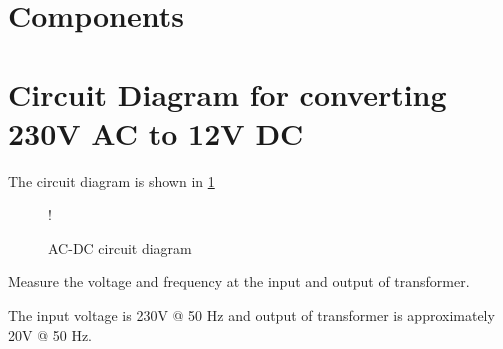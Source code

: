 \documentclass[journal,12pt,twocolumn]{IEEEtran}
\begin{document}
\section{Components}
\begin{table}[!h]
\centering

\caption{}
\label{table:components}
\end{table}
\section{Circuit Diagram for converting 230V AC to 12V DC }
The circuit diagram is shown in \ref{fig1}
\begin{figure}[!h]
\centering
\resizebox {\columnwidth} {!} {

}
\caption{AC-DC circuit diagram} 
\label{fig1}
\end{figure}

\begin{problem}
Measure the voltage and frequency at the input and output of transformer.
\end{problem}

\solution
The input voltage is 230V @ 50 Hz and output of transformer is approximately 20V @ 50 Hz.

\end{document}
